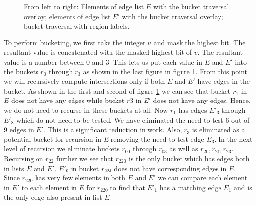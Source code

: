 \begin{figure}
\caption{\label{fig_radix_bucketing}From left to right: Elements of edge list $E$ with the bucket traversal overlay; elements of edge list $E'$ with the bucket traversal overlay; bucket traversal with region labels.}
\end{figure}

To perform bucketing, we first take the integer $u$ and mask the highest bit. The resultant value is concatenated with the masked highest bit of $v$. The resultant value is a number between 0 and 3. This lets us put each value in $E$ and $E'$ into the buckets $r_0$ through $r_3$ as shown in the last figure in figure \ref{fig_radix_bucketing}. From this point we will recursively compute intersections only if both $E$ and $E'$ have edges in the bucket. As shown in the first and second of figure \ref{fig_radix_bucketing} we can see that bucket $r_1$ in $E$ does not have any edges while bucket $r3$ in $E'$ does not have any edges. Hence, we do not need to recurse in these buckets at all. Now $r_1$ has edges $E'_3$ through $E'_8$ which do not need to be tested. We have eliminated the need to test 6 out of 9 edges in $E'$. This is a significant reduction in work. Also, $r_3$ is eliminated as a potential bucket for recursion in $E$ removing the need to test edge $E_3$. In the next level of recursion we eliminate buckets $r_{00}$ through $r_{03}$ as well as $r_{20}, r_{21}, r_{23}$. Recursing on $r_{22}$ further we see that $r_{220}$ is the only bucket which has edges both in lists $E$ and $E'$. $E'_9$ in bucket $r_{223}$ does not have corresponding edges in $E$. Since $r_{220}$ has very few elements in both $E$ and $E'$ we can compare each element in $E'$ to each element in $E$ for $r_{220}$ to find that $E'_1$ has a matching edge $E_1$ and is the only edge also present in list $E$.

